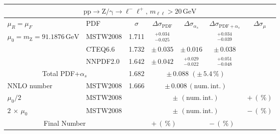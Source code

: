 \begin{table}[htb]
  \begin{center}
    \begin{tabular}{|l|l|c|c|c|c|c|}
      \hline
      
      \multicolumn{7}{|c|}{$\mathrm{pp}\to\mathrm{Z/\gamma}\to{\ell^-\ell^+},\,m_{\ell\ell}>20\,\mathrm{GeV}$}\\ \hline
      $\mu_R=\mu_F$ & PDF & $\sigma$ & $\Delta\sigma_{\mathrm{PDF}}$ & $\Delta\sigma_{\alpha_s}$ & $\Delta\sigma_{\mathrm{PDF}+\alpha_s}$ & $\Delta\sigma_{\mu}$ \\ \hline\hline

      $\mu_0=m_\mathrm{Z}=91.1876\,\mathrm{GeV}$ & MSTW2008 & 1.711 & $^{+0.034}_{-0.025}$ &     &  $^{+0.034}_{-0.039}$    &     \\
                                                & CTEQ6.6  & 1.732 & $\pm\,0.035$ &  $\pm\,0.016$  &  $\pm\,0.038$       &     \\
                                                & NNPDF2.0 & 1.642 & $\pm\,0.042$ &  $^{+0.029}_{-0.022}$  & $^{+0.051}_{-0.048}$     &     \\ \hline\hline
      \multicolumn{2}{|c|}{Total PDF+$\alpha_s$}      &  1.682    & \multicolumn{3}{c|}{$\pm\,0.088\,\,(\pm\,5.4\,\%)$} & \\ \hline\hline
      NNLO number                               & MSTW2008 & 1.666 & \multicolumn{3}{c|}{$\pm\,0.008\,(\mathrm{num.\,int.})$} & \\
      $\mu_0/2$                                 & MSTW2008 &  & \multicolumn{3}{c|}{$\pm\,\,(\mathrm{num.\,int.})$} & $+\,(\,\%)$\\
      $2\,\times\,\mu_0$                        & MSTW2008 &  & \multicolumn{3}{c|}{$\pm\,\,(\mathrm{num.\,int.})$} & $-\,(\,\%)$\\ \hline\hline
      \multicolumn{2}{|c|}{Final Number} &  & \multicolumn{2}{l}{$+\,(\,\%)$} & \multicolumn{2}{l|}{$-\,(\,\%)$} \\


\hline 
\end{tabular}
\end{center}
\end{table} 

